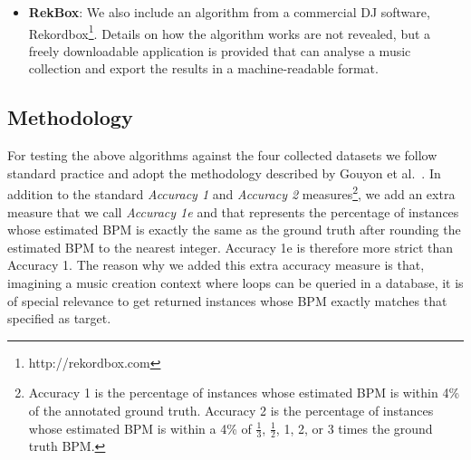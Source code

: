 \documentclass{article}
\begin{document}
\begin{itemize}
	\item \textbf{RekBox}: We also include an algorithm from a commercial DJ software, Rekordbox\footnote{http://rekordbox.com}. Details on how the algorithm works are not revealed, but a freely downloadable application is provided that can analyse a music collection and export the results in a machine-readable format.
\end{itemize}


\subsection{Methodology}\label{sec:methodology}

For testing the above algorithms against the four collected datasets we follow standard practice and adopt the methodology described by Gouyon et al.~\cite{Gouyon2006}.
In addition to the standard \emph{Accuracy 1} and \emph{Accuracy 2} measures\footnote{Accuracy 1 is the percentage of instances whose estimated BPM is within 4\% of the annotated ground truth. Accuracy 2 is the percentage of instances whose estimated BPM is within a 4\% of $\frac{1}{3}$, $\frac{1}{2}$, 1, 2, or 3 times the ground truth BPM.}, we add an extra measure that we call \emph{Accuracy 1e} and that represents the percentage of instances whose estimated BPM is exactly the same as the ground truth after rounding the estimated BPM to the nearest integer. Accuracy 1e is therefore more strict than Accuracy 1.
The reason why we added this extra accuracy measure is that, imagining a music creation context where loops can be queried in a database, it is of special relevance to get returned instances whose BPM exactly matches that specified as target. %
\end{document}
